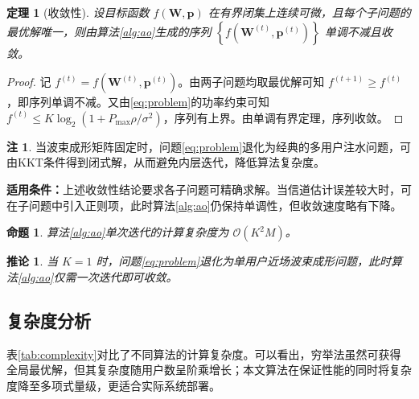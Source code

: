 \documentclass[UTF8, a4paper, zihao=-4, fontset=windows, twocolumn]{ctexart}
\theoremstyle{plain}
\newtheorem{theorem}{定理}
\newtheorem{corollary}{推论}
\theoremstyle{definition}
\newtheorem{remark}{注}
\theoremstyle{plain}
\newtheorem{proposition}{命题}
\begin{document}
\begin{theorem}[收敛性]\label{thm:convergence}
设目标函数 $f(\mathbf{W},\mathbf{p})$ 在有界闭集上连续可微，且每个子问题的最优解唯一，则由算法\ref{alg:ao}生成的序列 $\left\{f\left(\mathbf{W}^{(t)},\mathbf{p}^{(t)}\right)\right\}$ 单调不减且收敛。
\end{theorem}

\begin{proof}
记 $f^{(t)}=f\left(\mathbf{W}^{(t)},\mathbf{p}^{(t)}\right)$。由两子问题均取最优解可知 $f^{(t+1)}\ge f^{(t)}$，即序列单调不减。又由\eqref{eq:problem}的功率约束可知 $f^{(t)}\le K\log_2\left(1+P_{\max}\rho/\sigma^2\right)$，序列有上界。由单调有界定理，序列收敛。
\end{proof}

\begin{remark}\label{rem:water}
当波束成形矩阵固定时，问题\eqref{eq:problem}退化为经典的多用户注水问题，可由KKT条件得到闭式解，从而避免内层迭代，降低算法复杂度。
\end{remark}

\begin{mdframed}[linewidth=0.6pt, linecolor=black!45, backgroundcolor=black!4,
                 roundcorner=3pt, leftmargin=1em, rightmargin=1em,
                 innertopmargin=0.6em, innerbottommargin=0.6em]
\textbf{适用条件：}上述收敛性结论要求各子问题可精确求解。当信道估计误差较大时，可在子问题中引入正则项，此时算法\ref{alg:ao}仍保持单调性，但收敛速度略有下降。
\end{mdframed}

\begin{proposition}\label{prop:complexity}
算法\ref{alg:ao}单次迭代的计算复杂度为 $\mathcal{O}\left(K^2M\right)$。
\end{proposition}

\begin{corollary}\label{cor:special}
当 $K=1$ 时，问题\eqref{eq:problem}退化为单用户近场波束成形问题，此时算法\ref{alg:ao}仅需一次迭代即可收敛。
\end{corollary}

\subsection{复杂度分析}\label{sec:complexity}

表\ref{tab:complexity}对比了不同算法的计算复杂度。可以看出，穷举法虽然可获得全局最优解，但其复杂度随用户数呈阶乘增长；本文算法在保证性能的同时将复杂度降至多项式量级，更适合实际系统部署。
\end{document}

